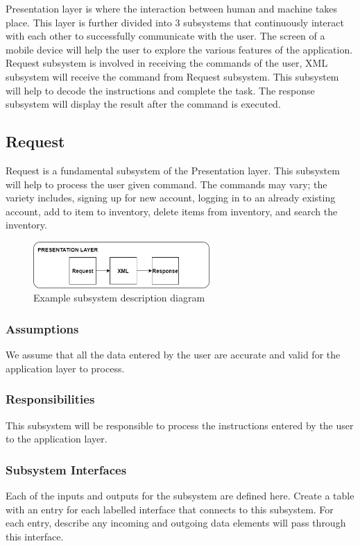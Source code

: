 Presentation layer is where the interaction between human and machine takes place. This layer is further divided 
into 3 subsystems that continuously interact with each other to successfully communicate with the user. The screen 
of a mobile device will help the user to explore the various features of the application. Request subsystem is 
involved in receiving the commands of the user, XML subsystem will receive the command from Request subsystem. 
This subsystem will help to decode the instructions and complete the task. The response subsystem will display 
the result after the command is executed.

\subsection{Request}
Request is a fundamental subsystem of the Presentation layer. This subsystem will help to process the user given
 command. The commands may vary; the variety includes, signing up for new account, logging in to an already 
 existing account, add to item to inventory, delete items from inventory, and search the inventory.

\begin{figure}[h!]
	\centering
 	\includegraphics[width=0.60\textwidth]{images/Pre.jpg}
 \caption{Example subsystem description diagram}
\end{figure}

\subsubsection{Assumptions}
We assume that all the data entered by the user are accurate and valid for the application layer to process.

\subsubsection{Responsibilities}
This subsystem will be responsible to process the instructions entered by the user to the application layer. 

\subsubsection{Subsystem Interfaces}
Each of the inputs and outputs for the subsystem are defined here. Create a table with an entry for each labelled 
interface that connects to this subsystem. For each entry, describe any incoming and outgoing data elements will
 pass through this interface.

